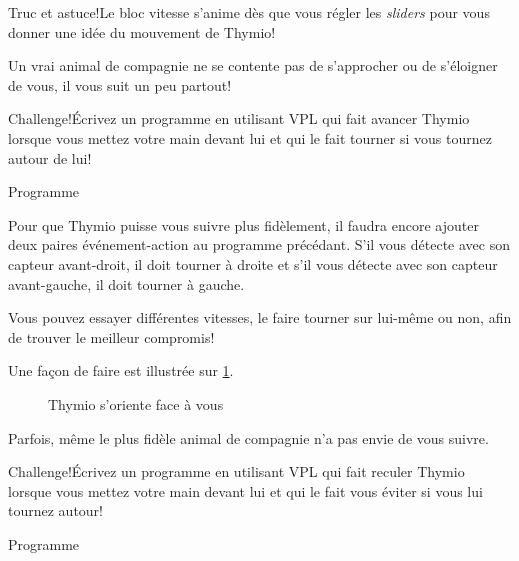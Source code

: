 \begin{bclogo}[couleur = blue!30, arrondi = 0.1, logo = \bcinfo, ombre = true]{Truc et astuce!}Le bloc vitesse s'anime dès que vous régler les \textit{sliders} pour vous donner une idée du mouvement de Thymio!
\end{bclogo}


Un vrai animal de compagnie ne se contente pas de s'approcher ou de s'éloigner de vous, il vous suit un peu partout! 

\begin{bclogo}[couleur = pink!30, arrondi = 0.1, logo = \bccrayon, ombre = true]{Challenge!}Écrivez un programme en utilisant VPL qui fait avancer Thymio lorsque vous mettez votre main devant lui et qui le fait tourner si vous tournez autour de lui!
\end{bclogo}

{\raggedleft \hfill Programme }

Pour que Thymio puisse vous suivre plus fidèlement, il faudra encore ajouter deux paires événement-action au programme précédant. S'il vous détecte avec son capteur avant-droit, il doit tourner à droite et s'il vous détecte avec son capteur avant-gauche, il doit tourner à gauche.

Vous pouvez essayer différentes vitesses, le faire tourner sur lui-même ou non, afin de trouver le meilleur compromis! 

Une façon de faire est illustrée sur \cref{fig.likes}.

\begin{figure}
\begin{center}
\caption{Thymio s'oriente face à vous}\label{fig.likes}
\end{center}
\end{figure}


Parfois, même le plus fidèle animal de compagnie n'a pas envie de vous suivre. 

\begin{bclogo}[couleur = pink!30, arrondi = 0.1, logo = \bccrayon, ombre = true]{Challenge!}Écrivez un programme en utilisant VPL qui fait reculer Thymio lorsque vous mettez votre main devant lui et qui le fait vous éviter si vous lui tournez autour!
\end{bclogo}

{\raggedleft \hfill Programme }

